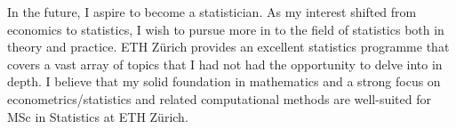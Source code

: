 In the future, I aspire to become a statistician.
As my interest shifted from economics to statistics,
I wish to pursue more in to the field of statistics both in theory and practice.
ETH Z\"urich provides an excellent statistics programme that covers a vast array of topics
that I had not had the opportunity to delve into in depth.
I believe that my solid foundation in mathematics and a strong focus on econometrics/statistics and related computational methods
are well-suited for MSc in Statistics at ETH Z\"urich.
